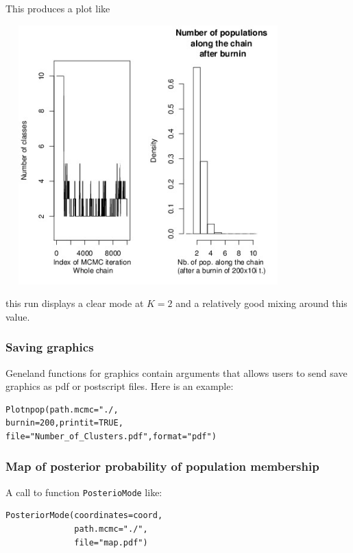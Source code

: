 \documentclass{article}
\begin{document}
This produces a plot like

\centerline{\includegraphics[height=10cm,width=11cm]{../inst/images/npop.jpeg}}

this run displays a clear mode at $K=2$ and a relatively good mixing around this value.


\subsubsection{Saving graphics}

{\sc Geneland} functions for graphics contain arguments that allows users to send save graphics as pdf or postscript files. 
Here is an example:

\begin{verbatim}
Plotnpop(path.mcmc="./,
burnin=200,printit=TRUE,
file="Number_of_Clusters.pdf",format="pdf")
\end{verbatim}



\clearpage
\subsubsection{Map of posterior probability of population membership}

A call to function \texttt{PosterioMode} like:\\

\begin{verbatim}
PosteriorMode(coordinates=coord,
              path.mcmc="./",
              file="map.pdf")
\end{verbatim}
\end{document}
